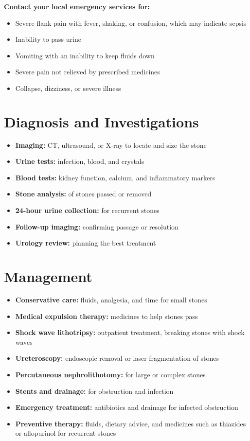 \textbf{Contact your local emergency services for:}
\begin{itemize}
    \item Severe flank pain with fever, shaking, or confusion, which may indicate sepsis
    \item Inability to pass urine
    \item Vomiting with an inability to keep fluids down
    \item Severe pain not relieved by prescribed medicines
    \item Collapse, dizziness, or severe illness
\end{itemize}

\section*{Diagnosis and Investigations}
\begin{itemize}
    \item \textbf{Imaging:} CT, ultrasound, or X-ray to locate and size the stone
    \item \textbf{Urine tests:} infection, blood, and crystals
    \item \textbf{Blood tests:} kidney function, calcium, and inflammatory markers
    \item \textbf{Stone analysis:} of stones passed or removed
    \item \textbf{24-hour urine collection:} for recurrent stones
    \item \textbf{Follow-up imaging:} confirming passage or resolution
    \item \textbf{Urology review:} planning the best treatment
\end{itemize}

\section*{Management}
\begin{itemize}
    \item \textbf{Conservative care:} fluids, analgesia, and time for small stones
    \item \textbf{Medical expulsion therapy:} medicines to help stones pass
    \item \textbf{Shock wave lithotripsy:} outpatient treatment, breaking stones with shock waves
    \item \textbf{Ureteroscopy:} endoscopic removal or laser fragmentation of stones
    \item \textbf{Percutaneous nephrolithotomy:} for large or complex stones
    \item \textbf{Stents and drainage:} for obstruction and infection
    \item \textbf{Emergency treatment:} antibiotics and drainage for infected obstruction
    \item \textbf{Preventive therapy:} fluids, dietary advice, and medicines such as thiazides or allopurinol for recurrent stones
\end{itemize}

